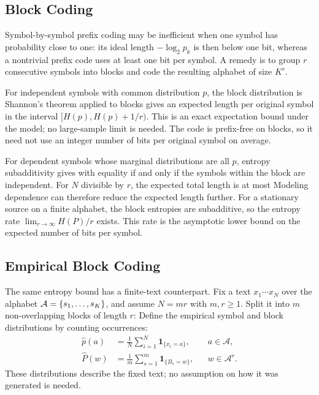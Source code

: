 \subsection{Block Coding}
\label{sec-shannon-block-coding}

Symbol-by-symbol prefix coding may be inefficient when one symbol has probability close to one: its ideal length $-\log_2p_k$ is then below one bit, whereas a nontrivial prefix code uses at least one bit per symbol. A remedy is to group $r$ consecutive symbols into blocks and code the resulting alphabet of size $K^r$.

For independent symbols with common distribution $p$, the block distribution is
Shannon's theorem applied to blocks gives an expected length per original symbol in the interval $[H(p),H(p)+1/r)$. This is an exact expectation bound under the model; no large-sample limit is needed. The code is prefix-free on blocks, so it need not use an integer number of bits per original symbol on average.

For dependent symbols whose marginal distributions are all $p$, entropy subadditivity gives
with equality if and only if the symbols within the block are independent. For $N$ divisible by $r$, the expected total length is at most
Modeling dependence can therefore reduce the expected length further. For a stationary source on a finite alphabet, the block entropies are subadditive, so the entropy rate $\lim_{r\to\infty}H(P)/r$ exists. This rate is the asymptotic lower bound on the expected number of bits per symbol.


\subsection{Empirical Block Coding}
\label{sec-shannon-empirical-blocks}

The same entropy bound has a finite-text counterpart. Fix a text $x_1\cdots x_N$ over the alphabet $\mathcal A=\{s_1,\ldots,s_K\}$, and assume $N=mr$ with $m,r\geq1$. Split it into $m$ non-overlapping blocks of length $r$:
Define the empirical symbol and block distributions by counting occurrences:
\begin{align}
 \label{eq-empirical-symbol-distribution}
 \hat p(a)&=\frac1N\sum_{i=1}^N\mathbf1_{\{x_i=a\}},
 &&a\in\mathcal A,\\
 \label{eq-empirical-block-distribution}
 \hat P(w)&=\frac1m\sum_{s=1}^m\mathbf1_{\{B_s=w\}},
 &&w\in\mathcal A^r.
\end{align}
These distributions describe the fixed text; no assumption on how it was generated is needed.

